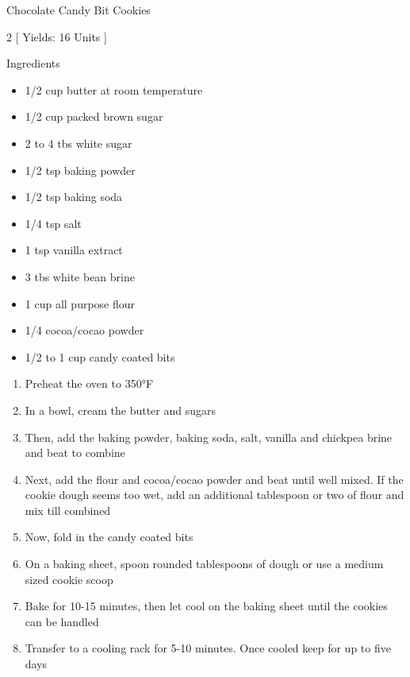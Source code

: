 \begin{Large}
    Chocolate Candy Bit Cookies
\end{Large}

\begin{scriptsize}
\begin{multicols}{2}
[
\vspace{1em}
Yields: 16 Units
\vspace{-1.5em}
]

Ingredients
\begin{itemize}
    \item 1/2 cup butter at room temperature
    \item 1/2 cup packed brown sugar
    \item 2 to 4 tbs white sugar

    \item 1/2 tsp baking powder
    \item 1/2 tsp baking soda
    \item 1/4 tsp salt
    \item 1 tsp vanilla extract
    \item 3 tbs white bean brine

    \item 1 cup all purpose flour %
    \item 1/4 cocoa/cocao powder
    \item 1/2 to 1 cup candy coated bits

\end{itemize}
\end{multicols}
\end{scriptsize}

\begin{footnotesize}
\begin{enumerate}
    \item Preheat the oven to 350°F
    \item In a bowl, cream the butter and sugars
    \item Then, add the baking powder, baking soda, salt, vanilla and chickpea brine and beat to combine
    \item Next, add the flour and cocoa/cocao powder and beat until well mixed. If the cookie dough seems too wet, add an additional tablespoon or two of flour and mix till combined
    \item Now, fold in the candy coated bits
    \item On a baking sheet, spoon rounded tablespoons of dough or use a medium sized cookie scoop
    \item Bake for 10-15 minutes, then let cool on the baking sheet until the cookies can be handled
    \item Transfer to a cooling rack for 5-10 minutes. Once cooled keep for up to five days

\end{enumerate}
\end{footnotesize}

\vspace{2em}
